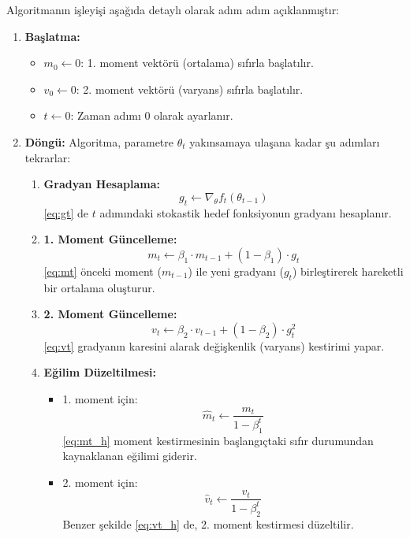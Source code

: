 Algoritmanın işleyişi aşağıda detaylı olarak adım adım açıklanmıştır:
\begin{enumerate}
    \item \textbf{Başlatma:}
    \begin{itemize}
        \item $m_0 \gets 0$: 1. moment vektörü (ortalama) sıfırla başlatılır.
        \item $v_0 \gets 0$: 2. moment vektörü (varyans) sıfırla başlatılır.
        \item $t \gets 0$: Zaman adımı 0 olarak ayarlanır.
    \end{itemize}
    
    \item \textbf{Döngü:} Algoritma, parametre $\theta_t$ yakınsamaya ulaşana kadar şu adımları tekrarlar:
    \begin{enumerate}
        \item \textbf{Gradyan Hesaplama:}
        \begin{equation}
        g_t \gets \nabla_\theta f_t(\theta_{t-1})
        \label{eq:gt}
        \end{equation}
        \eqref{eq:gt} de $t$ adımındaki stokastik hedef fonksiyonun gradyanı hesaplanır.
        
        \item \textbf{1. Moment Güncelleme:}
        \begin{equation}
        m_t \gets \beta_1 \cdot m_{t-1} + (1 - \beta_1) \cdot g_t
        \label{eq:mt}
        \end{equation}
        \eqref{eq:mt} önceki moment ($m_{t-1}$) ile yeni gradyanı ($g_t$) birleştirerek hareketli bir ortalama oluşturur.
        
        \item \textbf{2. Moment Güncelleme:}
        \begin{equation}
        v_t \gets \beta_2 \cdot v_{t-1} + (1 - \beta_2) \cdot g_t^2
        \label{eq:vt}
        \end{equation}
        \eqref{eq:vt} gradyanın karesini alarak değişkenlik (varyans) kestirimi yapar.
        
        \item \textbf{Eğilim Düzeltilmesi:}
        \begin{itemize}
            \item 1. moment için:
            \begin{equation}
            \hat{m}_t \gets \frac{m_t}{1 - \beta_1^t}
            \label{eq:mt_h}
            \end{equation}
            \eqref{eq:mt_h} moment kestirmesinin başlangıçtaki sıfır durumundan kaynaklanan eğilimi giderir.
            \item 2. moment için:
            \begin{equation}
            \hat{v}_t \gets \frac{v_t}{1 - \beta_2^t}
            \label{eq:vt_h}
            \end{equation}
            Benzer şekilde \eqref{eq:vt_h} de, 2. moment kestirmesi düzeltilir.
        \end{itemize}
        

\end{enumerate}
\end{enumerate}
